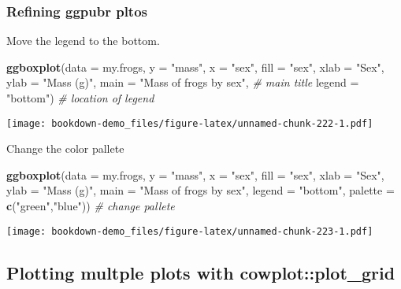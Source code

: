 \documentclass[]{book}
\newenvironment{Shaded}{\begin{snugshade}}{\end{snugshade}}
\newcommand{\KeywordTok}[1]{\textcolor[rgb]{0.13,0.29,0.53}{\textbf{#1}}}
\newcommand{\DataTypeTok}[1]{\textcolor[rgb]{0.13,0.29,0.53}{#1}}
\newcommand{\StringTok}[1]{\textcolor[rgb]{0.31,0.60,0.02}{#1}}
\newcommand{\CommentTok}[1]{\textcolor[rgb]{0.56,0.35,0.01}{\textit{#1}}}
\newcommand{\NormalTok}[1]{#1}
\theoremstyle{definition}
\theoremstyle{definition}
\theoremstyle{definition}
\theoremstyle{remark}
\begin{document}
\subsubsection{Refining ggpubr pltos}\label{refining-ggpubr-pltos}

Move the legend to the bottom.

\begin{Shaded}
\begin{Highlighting}[]
\KeywordTok{ggboxplot}\NormalTok{(}\DataTypeTok{data =}\NormalTok{ my.frogs,}
          \DataTypeTok{y =} \StringTok{"mass"}\NormalTok{,}
          \DataTypeTok{x =} \StringTok{"sex"}\NormalTok{,}
          \DataTypeTok{fill =} \StringTok{"sex"}\NormalTok{,}
          \DataTypeTok{xlab =} \StringTok{"Sex"}\NormalTok{,}
          \DataTypeTok{ylab =} \StringTok{"Mass (g)"}\NormalTok{,}
          \DataTypeTok{main =} \StringTok{"Mass of frogs by sex"}\NormalTok{, }\CommentTok{# main title}
          \DataTypeTok{legend =} \StringTok{"bottom"}\NormalTok{)             }\CommentTok{# location of legend}
\end{Highlighting}
\end{Shaded}

\texttt{[image: bookdown-demo\_files/figure-latex/unnamed-chunk-222-1.pdf]}

Change the color pallete

\begin{Shaded}
\begin{Highlighting}[]
\KeywordTok{ggboxplot}\NormalTok{(}\DataTypeTok{data =}\NormalTok{ my.frogs,}
          \DataTypeTok{y =} \StringTok{"mass"}\NormalTok{,}
          \DataTypeTok{x =} \StringTok{"sex"}\NormalTok{,}
          \DataTypeTok{fill =} \StringTok{"sex"}\NormalTok{,}
          \DataTypeTok{xlab =} \StringTok{"Sex"}\NormalTok{,}
          \DataTypeTok{ylab =} \StringTok{"Mass (g)"}\NormalTok{,}
          \DataTypeTok{main =} \StringTok{"Mass of frogs by sex"}\NormalTok{,}
          \DataTypeTok{legend =} \StringTok{"bottom"}\NormalTok{,}
          \DataTypeTok{palette =} \KeywordTok{c}\NormalTok{(}\StringTok{"green"}\NormalTok{,}\StringTok{"blue"}\NormalTok{))  }\CommentTok{# change pallete}
\end{Highlighting}
\end{Shaded}

\texttt{[image: bookdown-demo\_files/figure-latex/unnamed-chunk-223-1.pdf]}

\subsection{Plotting multple plots with
cowplot::plot\_grid}\label{plotting-multple-plots-with-cowplotplot_grid}
\end{document}
